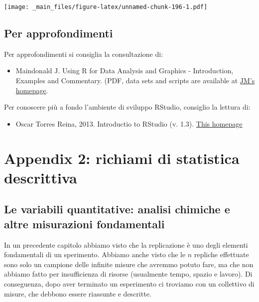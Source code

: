 \documentclass[a4paper,12pt,oneside]{book}
\providecommand{\tightlist}{%
  \setlength{\itemsep}{0pt}\setlength{\parskip}{0pt}}
\theoremstyle{definition}
\theoremstyle{definition}
\theoremstyle{definition}
\theoremstyle{remark}
\begin{document}
\texttt{[image: \_main\_files/figure-latex/unnamed-chunk-196-1.pdf]}

\section*{Per approfondimenti}\label{per-approfondimenti-2}

Per approfondimenti si consiglia la consultazione di:

\begin{itemize}
\tightlist
\item
  Maindonald J. Using R for Data Analysis and Graphics - Introduction,
  Examples and Commentary. (PDF, data sets and scripts are available at
  \href{https://cran.r-project.org/doc/contrib/usingR.pdff}{JM's
  homepage}.
\end{itemize}

Per conoscere più a fondo l'ambiente di sviluppo RStudio, consiglio la
lettura di:

\begin{itemize}
\tightlist
\item
  Oscar Torres Reina, 2013. Introductio to RStudio (v. 1.3).
  \href{https://dss.princeton.edu/training/RStudio101.pdf}{This
  homepage}
\end{itemize}

\chapter*{Appendix 2: richiami di statistica
descrittiva}\label{appendix-2-richiami-di-statistica-descrittiva}

\section*{Le variabili quantitative: analisi chimiche e altre
misurazioni
fondamentali}\label{le-variabili-quantitative-analisi-chimiche-e-altre-misurazioni-fondamentali}

In un precedente capitolo abbiamo visto che la replicazione è uno degli
elementi fondamentali di un sperimento. Abbiamo anche visto che le \(n\)
repliche effettuate sono solo un campione delle infinite misure che
avremmo potuto fare, ma che non abbiamo fatto per insufficienza di
risorse (usualmente tempo, spazio e lavoro). Di conseguenza, dopo aver
terminato un esperimento ci troviamo con un collettivo di misure, che
debbono essere riassunte e descritte.
\end{document}
